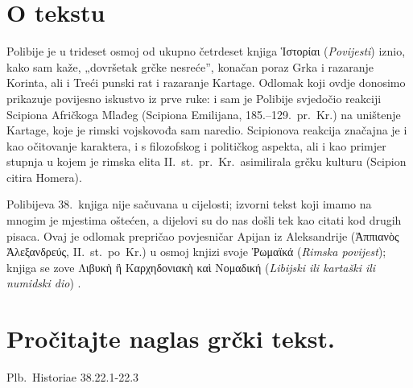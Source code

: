 
\section*{O tekstu}

Polibije je u trideset osmoj od ukupno četrdeset knjiga \textgreek[variant=ancient]{Ἱστορίαι} (\textit{Povijesti}) iznio, kako sam kaže, „dovršetak grčke nesreće”, konačan poraz Grka i razaranje Korinta, ali i Treći punski rat i razaranje Kartage. Odlomak koji ovdje donosimo prikazuje povijesno iskustvo iz prve ruke: i sam je Polibije svjedočio reakciji Scipiona Afričkoga Mlađeg (Scipiona Emilijana, 185.–129.\ pr.~Kr.) na uništenje Kartage, koje je rimski vojskovođa sam naredio. Scipionova reakcija značajna je i kao očitovanje karaktera, i s filozofskog i političkog aspekta, ali i kao primjer stupnja u kojem je rimska elita II.~st.\ pr.~Kr.\ asimilirala grčku kulturu (Scipion citira Homera).

Polibijeva 38.\ knjiga nije sačuvana u cijelosti; izvorni tekst koji imamo na mnogim je mjestima oštećen, a dijelovi su do nas došli tek kao citati kod drugih pisaca. Ovaj je odlomak prepričao povjesničar Apijan iz Aleksandrije \textgreek[variant=ancient]{(Ἀππιανὸς Ἀλεξανδρεύς,} II.~st.\ po~Kr.) u osmoj knjizi svoje \textgreek[variant=ancient]{Ῥωμαϊκά} (\textit{Rimska povijest}); knjiga se zove \textgreek[variant=ancient]{Λιβυκὴ ἢ Καρχηδονιακὴ καὶ Νομαδική} (\textit{Libijski ili kartaški ili numidski dio}) .


\section*{Pročitajte naglas grčki tekst.}

Plb.\ Historiae 38.22.1-22.3


\medskip


